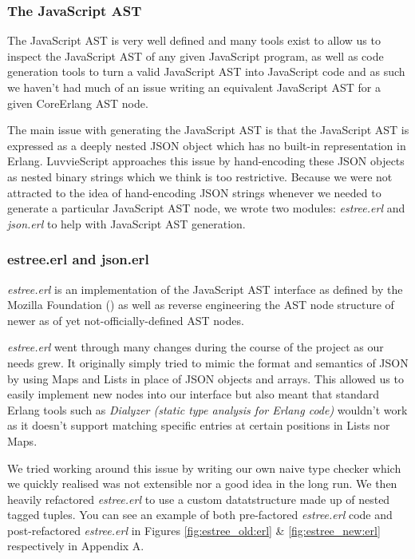 \documentclass[twoside,12pt,titlepage,a4paper]{article}
\begin{document}
\subsubsection{The JavaScript AST}
The JavaScript AST is very well defined and many tools exist to allow us to inspect the JavaScript AST of any given JavaScript program, as well as code generation tools to turn a valid JavaScript AST into JavaScript code and as such we haven't had much of an issue writing an equivalent JavaScript AST for a given CoreErlang AST node.

The main issue with generating the JavaScript AST is that the JavaScript AST is expressed as a deeply nested JSON object which has no built-in representation in Erlang. LuvvieScript \citep{luvvieGitHub} approaches this issue by hand-encoding these JSON objects as nested binary strings which we think is too restrictive. Because we were not attracted to the idea of hand-encoding JSON strings whenever we needed to generate a particular JavaScript AST node, we wrote two modules: \textit{estree.erl} and \textit{json.erl} to help with JavaScript AST generation.

\subsubsection{estree.erl and json.erl}
\textit{estree.erl} is an implementation of the JavaScript AST interface as defined by the Mozilla Foundation (\citeyear{EStreeMDN}) as well as reverse engineering the AST node structure of newer as of yet not-officially-defined AST nodes.

\textit{estree.erl} went through many changes during the course of the project as our needs grew. It originally simply tried to mimic the format and semantics of JSON by using Maps and Lists in place of JSON objects and arrays. This allowed us to easily implement new nodes into our interface but also meant that standard Erlang tools such as \textit{Dialyzer (static type analysis for Erlang code)} \citep{dialyzerPdf} wouldn't work as it doesn't support matching specific entries at certain positions in Lists nor Maps.

We tried working around this issue by writing our own naive type checker which we quickly realised was not extensible nor a good idea in the long run. We then heavily refactored \textit{estree.erl} to use a custom datatstructure made up of nested tagged tuples. You can see an example of both pre-factored \textit{estree.erl} code and post-refactored \textit{estree.erl} in Figures \ref{fig:estree_old:erl} \& \ref{fig:estree_new:erl} respectively in Appendix A.
\end{document}
